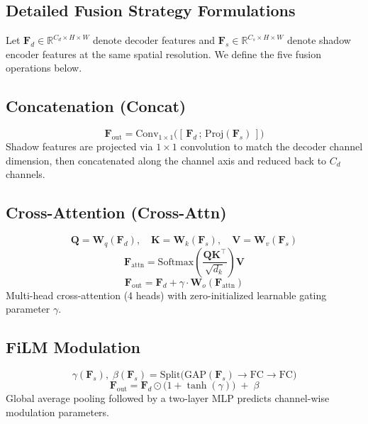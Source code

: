 \documentclass[pdflatex,sn-basic,Numbered]{sn-jnl}
\theoremstyle{thmstyleone}
\theoremstyle{thmstyletwo}
\theoremstyle{thmstylethree}
\begin{document}
\begin{appendices}

\section{Detailed Fusion Strategy Formulations}\label{sec:appendix_formulas}

Let $\mathbf{F}_d \in \mathbb{R}^{C_d \times H \times W}$ denote decoder features and $\mathbf{F}_s \in \mathbb{R}^{C_s \times H \times W}$ denote shadow encoder features at the same spatial resolution.
We define the five fusion operations below.

\subsection*{Concatenation (Concat)}
\begin{equation}
  \mathbf{F}_{\text{out}} = \text{Conv}_{1\times1}\big([\,\mathbf{F}_d \,;\, \text{Proj}(\mathbf{F}_s)\,]\big)
\end{equation}
Shadow features are projected via $1\times1$ convolution to match the decoder channel dimension, then concatenated along the channel axis and reduced back to $C_d$ channels.

\subsection*{Cross-Attention (Cross-Attn)}
\begin{equation}
  \mathbf{Q} = \mathbf{W}_q(\mathbf{F}_d), \quad \mathbf{K} = \mathbf{W}_k(\mathbf{F}_s), \quad \mathbf{V} = \mathbf{W}_v(\mathbf{F}_s)
\end{equation}
\begin{equation}
  \mathbf{F}_{\text{attn}} = \text{Softmax}\!\left(\frac{\mathbf{Q}\mathbf{K}^\top}{\sqrt{d_k}}\right)\mathbf{V}
\end{equation}
\begin{equation}
  \mathbf{F}_{\text{out}} = \mathbf{F}_d + \gamma \cdot \mathbf{W}_o(\mathbf{F}_{\text{attn}})
\end{equation}
Multi-head cross-attention (4 heads) with zero-initialized learnable gating parameter $\gamma$.

\subsection*{FiLM Modulation}
\begin{equation}
  \gamma(\mathbf{F}_s),\; \beta(\mathbf{F}_s) = \text{Split}\big(\text{GAP}(\mathbf{F}_s) \rightarrow \text{FC} \rightarrow \text{FC}\big)
\end{equation}
\begin{equation}
  \mathbf{F}_{\text{out}} = \mathbf{F}_d \odot \big(1 + \tanh(\gamma)\big) \;+\; \beta
\end{equation}
Global average pooling followed by a two-layer MLP predicts channel-wise modulation parameters.


\end{appendices}
\end{document}
